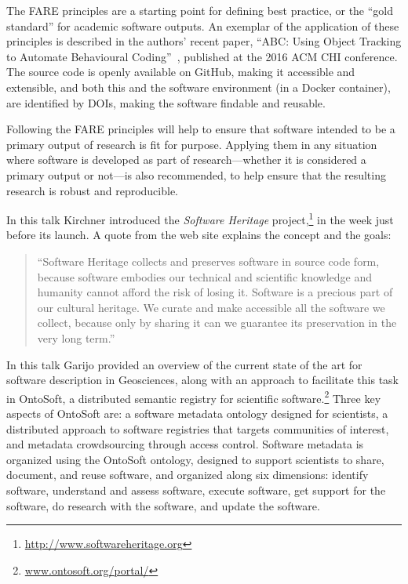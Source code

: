 \documentclass[a4paper,UKenglish]{dagrep}
\begin{document}
The FARE principles are a starting point for defining best practice, or the ``gold standard'' for academic software outputs. An exemplar of the application of these principles is described in the authors' recent paper, ``ABC: Using Object Tracking to Automate Behavioural Coding''~\cite{apaolaza_2016}, published at the 2016 ACM CHI conference. The source code is openly available on GitHub, making it accessible and extensible, and both this and the software environment (in a Docker container), are identified by DOIs, making the software findable and reusable.

Following the FARE principles will help to ensure that software intended to be a primary output of research is fit for purpose. Applying them in any situation where software is developed as part of research---whether it is considered a primary output or not---is also recommended, to help ensure that the resulting research is robust and reproducible.


In this talk Kirchner introduced the \emph{Software Heritage} project,\footnote{\url{http://www.softwareheritage.org}} in the week just before its launch.
A quote from the web site explains the concept and the goals:
\begin{quote}
``Software Heritage collects and preserves software in source code form, because software embodies our technical and scientific knowledge and humanity cannot afford the risk of losing it.
Software is a precious part of our cultural heritage. We curate and make accessible all the software we collect, because only by sharing it can we guarantee its preservation in the very long term.''
\end{quote}


In this talk Garijo provided an overview of the current state of the art for software description in Geosciences, along with an approach to facilitate this task in OntoSoft, a distributed semantic registry for scientific software.\footnote{\url{www.ontosoft.org/portal/}} Three key aspects of OntoSoft are: a software metadata ontology designed for scientists, a distributed approach to software registries that targets communities of interest, and metadata crowdsourcing through access control. Software metadata is organized using the OntoSoft ontology, designed to support scientists to share, document, and reuse software, and organized along six dimensions: identify software, understand and assess software, execute software, get support for the software, do research with the software, and update the software.
\end{document}
